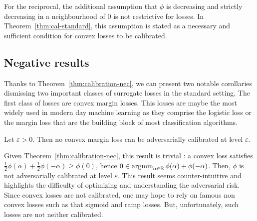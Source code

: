 

\begin{rmq} 




For the reciprocal, the additional assumption that $\phi$ is decreasing and strictly decreasing in a neighbourhood of $0$ is not restrictive for losses. In Theorem~\ref{thm:cal-standard}, this assumption is stated as a necessary and sufficient condition for convex losses to be calibrated.
\end{rmq}





\subsection{Negative results}

Thanks to Theorem~\ref{thm:calibration-nec}, we can present two notable corollaries dismissing two important classes of surrogate losses in the standard setting. The first class of losses are convex margin losses. This losses are maybe the most widely used in modern day machine learning as they comprise the logistic loss or the margin loss that are the building block of most classification algorithms. %

\begin{coro} Let $\varepsilon>0$. Then no convex margin loss can be adversarially calibrated at level $\varepsilon$.
\end{coro} 


Given Theorem~\ref{thm:calibration-nec}, this result is trivial : a convex loss satisfies $\frac12\phi(\alpha)+\frac12\phi(-\alpha)\geq \phi(0)$, hence $0\in \operatorname*{argmin}_{\alpha\in\mathbb{R}}
\phi(\alpha)+\phi(-\alpha)$.  Then, $\phi$ is not adversarially calibrated at level $\varepsilon$. This result seems counter-intuitive and highlights the difficulty of optimizing and understanding the adversarial risk. Since  convex losses are not calibrated, one may hope to rely on  famous non convex losses such as that sigmoid and ramp losses. But, unfortunately, such losses are not neither calibrated.




